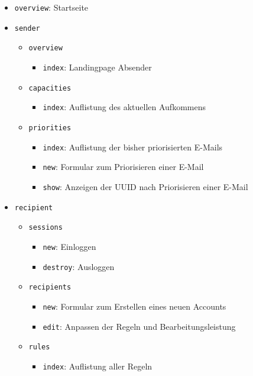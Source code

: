 \begin{itemize}
    \item \texttt{overview}: Startseite
    \item \texttt{sender}
    \begin{itemize}
        \item \texttt{overview}
        \begin{itemize}
            \item \texttt{index}: Landingpage Absender
        \end{itemize}
        \item \texttt{capacities}
        \begin{itemize}
            \item \texttt{index}: Auflistung des aktuellen Aufkommens
        \end{itemize}
        \item \texttt{priorities}
        \begin{itemize}
            \item \texttt{index}: Auflistung der bisher priorisierten E-Mails
            \item \texttt{new}: Formular zum Priorisieren einer E-Mail
            \item \texttt{show}: Anzeigen der UUID nach Priorisieren einer E-Mail
        \end{itemize}
    \end{itemize}
    \item \texttt{recipient}
    \begin{itemize}
        \item \texttt{sessions}
         \begin{itemize}
            \item \texttt{new}: Einloggen
            \item \texttt{destroy}: Ausloggen
        \end{itemize}
        \item \texttt{recipients}
        \begin{itemize}
            \item \texttt{new}: Formular zum Erstellen eines neuen Accounts  
            \item \texttt{edit}: Anpassen der Regeln und Bearbeitungsleistung
        \end{itemize}
        \item \texttt{rules}
        \begin{itemize}
            \item \texttt{index}: Auflistung aller Regeln

\end{itemize}
\end{itemize}
\end{itemize}

